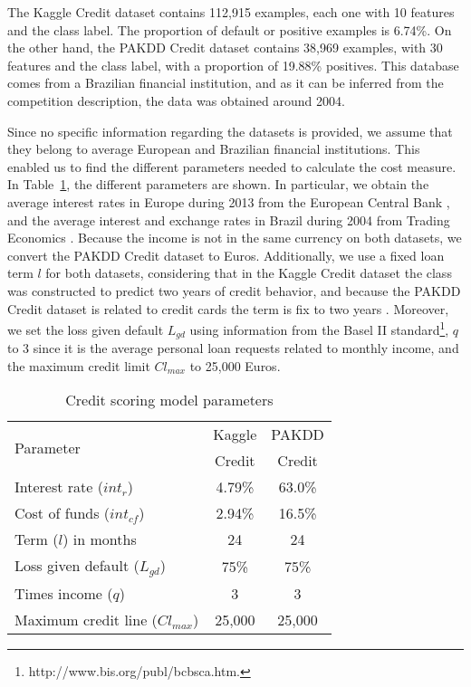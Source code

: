     The Kaggle Credit dataset contains 112,915 examples, each one with 10 features and the class 
    label. The proportion of default or positive examples is 6.74\%. 
    On the other hand, the PAKDD Credit dataset contains 38,969 examples, with 30 features and the 
    class label, with a proportion of 19.88\% positives. This database comes from a Brazilian 
    financial institution, and as it can be inferred from the competition description, the data 
    was obtained around 2004.
   
    Since no specific information regarding the datasets is provided, we assume that they belong to 
    average European and Brazilian financial institutions. This enabled us to find the different 
    parameters needed to calculate the cost measure. In Table~\ref{tab:4:parameters}, the different 
    parameters are shown. In particular, we obtain the average interest rates in Europe during 
    2013 from the European Central Bank \citep{ECB2014}, and the average interest and exchange 
    rates in Brazil during 2004 from Trading Economics \citep{Economics2014}. Because the income 
    is not in the same currency on both datasets, we convert the PAKDD Credit dataset to Euros.
    Additionally, we use a fixed loan term $l$ for both datasets, considering that in the Kaggle 
    Credit dataset the class was constructed to predict two years of credit behavior, and 
    because the PAKDD Credit dataset is related to credit cards the term is fix to two years 
    \citep{Lawrence2012}. Moreover, we set the loss given default $L_{gd}$ using information from 
    the Basel II standard\footnote{http://www.bis.org/publ/bcbsca.htm.}, $q$ to 3 since it is the 
    average personal loan requests related to monthly income, and the maximum credit limit 
    $Cl_{max}$ to 25,000 Euros.
    
\begin{table}
\centering
\footnotesize
\begin{tabular}{lcc}
\hline
\multirow{ 2}{*}{Parameter}&Kaggle& PAKDD \\
  & Credit& Credit \\
  \hline
  Interest rate ($int_r$) &  4.79\% & 63.0\% \\
  Cost of funds ($int_{cf}$) & 2.94\% & 16.5\% \\
  Term ($l$) in months & 24 & 24 \\
  Loss given default ($L_{gd}$) &75\% & 75\% \\
  Times income ($q$) & 3 & 3 \\
  Maximum credit line ($Cl_{max}$) & 25,000 & 25,000\\
  \hline
\end{tabular}
\caption{Credit scoring model parameters}
\label{tab:4:parameters}
\end{table}